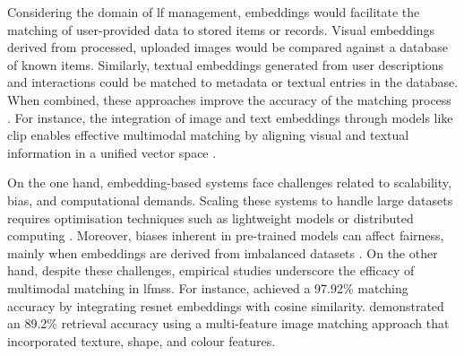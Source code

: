 Considering the domain of \ac{lf} management, embeddings would facilitate the matching of user-provided data to stored items or records. Visual embeddings derived from processed, uploaded images would be compared against a database of known items. Similarly, textual embeddings generated from user descriptions and interactions could be matched to metadata or textual entries in the database. When combined, these approaches improve the accuracy of the matching process \cite{Prawira2024, Radford2021}. For instance, the integration of image and text embeddings through models like \ac{clip} enables effective multimodal matching by aligning visual and textual information in a unified vector space \cite{Radford2021}.

On the one hand, embedding-based systems face challenges related to scalability, bias, and computational demands. Scaling these systems to handle large datasets requires optimisation techniques such as lightweight models or distributed computing \cite{Lubna2021}. Moreover, biases inherent in pre-trained models can affect fairness, mainly when embeddings are derived from imbalanced datasets \cite{Prawira2024}. On the other hand, despite these challenges, empirical studies underscore the efficacy of multimodal matching in \acp{lfms}. For instance,  achieved a 97.92\% matching accuracy by integrating \ac{resnet} embeddings with cosine similarity.  demonstrated an 89.2\% retrieval accuracy using a multi-feature image matching approach that incorporated texture, shape, and colour features.






